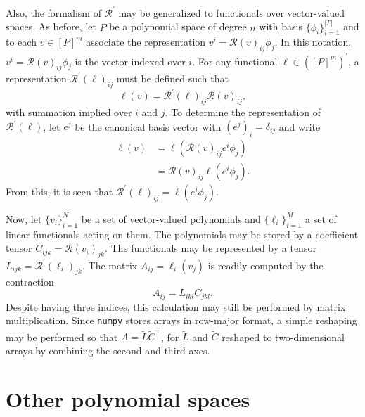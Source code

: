 Also, the formalism of \( \mathcal{R}^\prime \) may be generalized
to functionals over vector-valued spaces.  As before, let \( P \)
be a polynomial space of degree \( n \) with basis \( \{ \phi_i \}_{i=1}^{|P|}
\) and to each \( v \in [P]^m \) associate the representation \(
v^i = \mathcal{R}(v)_{ij}\phi_j \).  In this notation, \( v^i =
\mathcal{R}(v)_{ij} \phi_j \) is the vector indexed over \( i \).
For any functional \( \ell \in \left( [P]^m \right)^\prime
\), a representation \( \mathcal{R}^\prime(\ell)_{ij} \) must be defined
such that
\[
\ell(v) = \mathcal{R}^\prime(\ell)_{ij} \mathcal{R}(v)_{ij},
\]
with summation implied over \(i\) and \( j\).  To determine the
representation of \( \mathcal{R}^\prime(\ell) \), let \( e^j \) be the
canonical basis vector with \( (e^j)_i = \delta_{ij} \) and write
\begin{equation} \label{eq:strange}
\begin{split}
\ell(v)
& = \ell( \mathcal{R}(v)_{ij} e^i \phi_j ) \\
& = \mathcal{R}(v)_{ij} \ell( e^i \phi_j ).
\end{split}
\end{equation}
From this, it is seen that \( \mathcal{R}^\prime(\ell)_{ij} = \ell(
e^i \phi_j ) \).


Now, let \( \{ v_i \}_{i=1}^N \) be a set of vector-valued polynomials
and \( \{ \ell_i \}_{i=1}^M \) a set of linear functionals acting on
them.  The polynomials may be stored by a coefficient tensor \( C_{ijk}
= \mathcal{R}(v_i)_{jk} \).  The functionals may be represented by a
tensor \( L_{ijk} = \mathcal{R}^\prime(\ell_i)_{jk} \).  The matrix \(
A_{ij} = \ell_i(v_j) \) is readily computed by the contraction
\[
A_{ij} = L_{ikl} C_{jkl}.
\]
Despite having three indices, this calculation may still be performed by
matrix multiplication.  Since \texttt{numpy} stores arrays in row-major
format, a simple reshaping may be performed so that
\( A = \tilde{L} \tilde{C}^{\top} \), for \( \tilde{L} \) and \( \tilde{C} \)
reshaped to two-dimensional arrays by combining the second and third axes.


\section{Other polynomial spaces}


